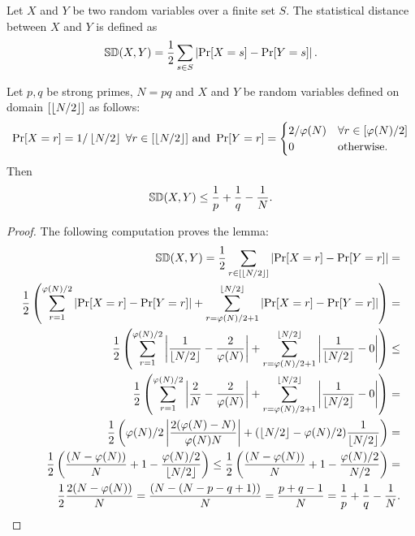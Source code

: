 \begin{definition}
Let $X$ and $Y$ be two random variables over a finite set $S$. The statistical distance between $X$ and $Y$ is defined as 
\[\mathbb{SD}(X, Y) = \frac{1}{2} \sum_{s \in S} \left| \Pr[X = s] - \Pr[Y = s] \right|.\]
\end{definition}


\begin{lemma}\label{sampling-lemma}
Let $p,q$ be strong primes, $N=pq$ and  $X$ and $Y$ be random variables defined on domain $[\left\lfloor N/2 \right\rfloor]$ as follows:
\[
\Pr[X = r] = 1/\left\lfloor N/2 \right\rfloor \; \forall r \in [\left\lfloor N/2 \right\rfloor] \text{ and } \Pr[Y = r] = 
\begin{cases} 
     2/\varphi(N) & \forall r \in [\varphi(N)/2] \\
     0 & \text{otherwise}. 
   \end{cases}
\]
Then 
\[
\mathbb{SD}(X, Y) \leq \frac{1}{p}+\frac{1}{q}-\frac{1}{N}.
\]
\end{lemma}


\begin{proof}
The following computation proves the lemma:
\begin{align*}
\mathbb{SD}(X, Y) = \frac{1}{2} \sum_{r \in [\left\lfloor N/2 \right\rfloor]} \left| \Pr[X = r] - \Pr[Y = r] \right| = \\ 
\frac{1}{2} \left( \sum_{r = 1}^{\varphi(N)/2} \left| \Pr[X = r] - \Pr[Y = r] \right| + \sum_{r = \varphi(N)/2+1}^{\left\lfloor N/2 \right\rfloor} \left| \Pr[X = r] - \Pr[Y = r] \right| \right) = 
\\
\frac{1}{2} \left( \sum_{r = 1}^{\varphi(N)/2} \left| \frac{1}{\left\lfloor N/2 \right\rfloor} - \frac{2}{\varphi(N)} \right| + \sum_{r = \varphi(N)/2+1}^{\left\lfloor N/2 \right\rfloor} \left| \frac{1}{\left\lfloor N/2 \right\rfloor} - 0 \right| \right) \leq \\
\frac{1}{2} \left( \sum_{r = 1}^{\varphi(N)/2} \left| \frac{2}{N} - \frac{2}{\varphi(N)} \right| + \sum_{r = \varphi(N)/2+1}^{\left\lfloor N/2 \right\rfloor} \left| \frac{1}{\left\lfloor N/2 \right\rfloor} - 0 \right| \right) = \\
\frac{1}{2} \left( \varphi(N)/2 \left| \frac{2(\varphi(N) - N)}{\varphi(N)N} \right| + (\left\lfloor N/2 \right\rfloor-\varphi(N)/2) \frac{1}{\left\lfloor N/2 \right\rfloor} \right) = \\
 \frac{1}{2} \left(\frac{(N-\varphi(N))}{N} + 1 - \frac{\varphi(N)/2}{{\left\lfloor N/2 \right\rfloor}} \right) \leq 
\frac{1}{2} \left(\frac{(N-\varphi(N))}{N} + 1 - \frac{\varphi(N)/2}{{N/2}} \right) = \\
 \frac{1}{2}\frac{2(N-\varphi(N))}{N} = 
\frac{(N-(N-p-q+1))}{N} = \frac{p+q-1}{N} = \frac{1}{p}+\frac{1}{q}-\frac{1}{N}.
\end{align*}
\end{proof}



